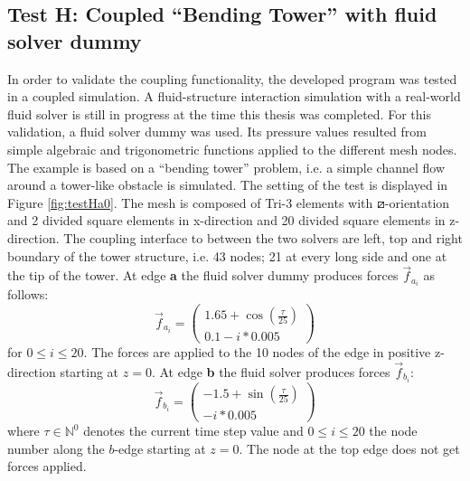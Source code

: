  \subsection{Test H: Coupled ``Bending Tower'' with fluid solver dummy}\label{sec:valid-H}
  In order to validate the coupling functionality, the developed program was tested in a coupled simulation. A fluid-structure interaction simulation with a real-world fluid solver is still in progress at the time this thesis was completed. For this validation, a fluid solver dummy was used. Its pressure values resulted from simple algebraic and trigonometric functions applied to the different mesh nodes. The example is based on a ``bending tower'' problem, i.e. a simple channel flow around a tower-like obstacle is simulated. The setting of the test is displayed in Figure \ref{fig:testHa0}. The mesh is composed of Tri-3 elements with $\boxslash$-orientation and 2 divided square elements in x-direction and 20 divided square elements in z-direction. The coupling interface to between the two solvers are left, top and right boundary of the tower structure, i.e. 43 nodes; 21 at every long side and one at the tip of the tower. At edge \textbf{a} the fluid solver dummy produces forces $\vec{f}_{a_i}$ as follows:
  \begin{equation*}
  \vec{f}_{a_i} = \begin{pmatrix}
  1.65 + \cos\left(\frac{\tau}{25}\right) \\ 0.1 - i*0.005
  \end{pmatrix}
  \end{equation*}
  for $0 \leq i \leq 20$. The forces are applied to the 10 nodes of the edge in positive z-direction starting at $z=0$. At edge \textbf{b} the fluid solver produces forces $\vec{f}_{b_i}$:
  \begin{equation*}
  \vec{f}_{b_i} = \begin{pmatrix}
  -1.5 + \sin\left(\frac{\tau}{25}\right) \\ -i*0.005
  \end{pmatrix}
  \end{equation*}
  where $\tau \in \mathbb{N}^0$ denotes the current time step value and $0 \leq i \leq 20$ the node number along the $b$-edge starting at $z=0$. The node at the top edge does not get forces applied.
  
